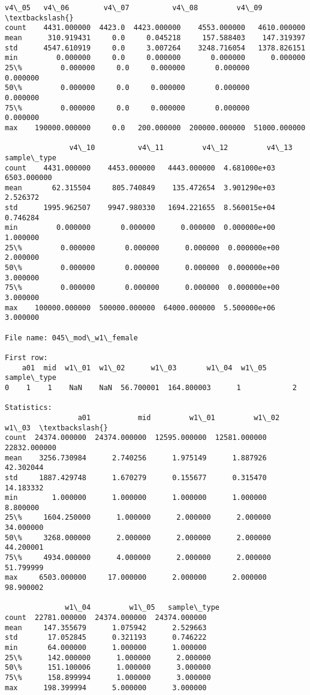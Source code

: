 \documentclass[11pt]{article}
\begin{document}
\begin{Verbatim}[commandchars=\\\{\}]
               v4\_05   v4\_06        v4\_07          v4\_08         v4\_09  \textbackslash{}
count    4431.000000  4423.0  4423.000000    4553.000000   4610.000000   
mean      310.919431     0.0     0.045218     157.588403    147.319397   
std      4547.610919     0.0     3.007264    3248.716054   1378.826151   
min         0.000000     0.0     0.000000       0.000000      0.000000   
25\%         0.000000     0.0     0.000000       0.000000      0.000000   
50\%         0.000000     0.0     0.000000       0.000000      0.000000   
75\%         0.000000     0.0     0.000000       0.000000      0.000000   
max    190000.000000     0.0   200.000000  200000.000000  51000.000000   

               v4\_10          v4\_11         v4\_12         v4\_13  sample\_type  
count    4431.000000    4453.000000   4443.000000  4.681000e+03  6503.000000  
mean       62.315504     805.740849    135.472654  3.901290e+03     2.526372  
std      1995.962507    9947.980330   1694.221655  8.560015e+04     0.746284  
min         0.000000       0.000000      0.000000  0.000000e+00     1.000000  
25\%         0.000000       0.000000      0.000000  0.000000e+00     2.000000  
50\%         0.000000       0.000000      0.000000  0.000000e+00     3.000000  
75\%         0.000000       0.000000      0.000000  0.000000e+00     3.000000  
max    100000.000000  500000.000000  64000.000000  5.500000e+06     3.000000  

File name: 045\_mod\_w1\_female

First row: 
    a01  mid  w1\_01  w1\_02      w1\_03       w1\_04  w1\_05  sample\_type
0    1    1    NaN    NaN  56.700001  164.800003      1            2

Statistics: 
                 a01           mid         w1\_01         w1\_02         w1\_03  \textbackslash{}
count  24374.000000  24374.000000  12595.000000  12581.000000  22832.000000   
mean    3256.730984      2.740256      1.975149      1.887926     42.302044   
std     1887.429748      1.670279      0.155677      0.315470     14.183332   
min        1.000000      1.000000      1.000000      1.000000      8.800000   
25\%     1604.250000      1.000000      2.000000      2.000000     34.000000   
50\%     3268.000000      2.000000      2.000000      2.000000     44.200001   
75\%     4934.000000      4.000000      2.000000      2.000000     51.799999   
max     6503.000000     17.000000      2.000000      2.000000     98.900002   

              w1\_04         w1\_05   sample\_type  
count  22781.000000  24374.000000  24374.000000  
mean     147.355679      1.075942      2.529663  
std       17.052845      0.321193      0.746222  
min       64.000000      1.000000      1.000000  
25\%      142.000000      1.000000      2.000000  
50\%      151.100006      1.000000      3.000000  
75\%      158.899994      1.000000      3.000000  
max      198.399994      5.000000      3.000000  


\end{Verbatim}
\end{document}
